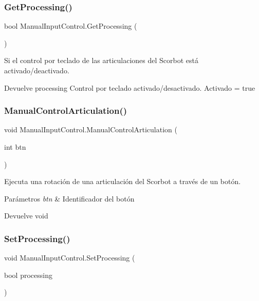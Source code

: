\subsubsection{\texorpdfstring{GetProcessing()}{GetProcessing()}}
{\footnotesize\ttfamily bool Manual\+Input\+Control.\+Get\+Processing (\begin{DoxyParamCaption}{ }\end{DoxyParamCaption})\hspace{0.3cm}{\ttfamily [inline]}}

Si el control por teclado de las articulaciones del Scorbot está activado/deactivado. \begin{DoxyReturn}{Devuelve}
processing Control por teclado activado/desactivado. Activado = true 
\end{DoxyReturn}
\mbox{\label{class_manual_input_control_a1e39de6319d6aad69e82f083d6d42058}} 
\subsubsection{\texorpdfstring{ManualControlArticulation()}{ManualControlArticulation()}}
{\footnotesize\ttfamily void Manual\+Input\+Control.\+Manual\+Control\+Articulation (\begin{DoxyParamCaption}\item[{int}]{btn }\end{DoxyParamCaption})\hspace{0.3cm}{\ttfamily [inline]}}

Ejecuta una rotación de una articulación del Scorbot a través de un botón. 
\begin{DoxyParams}{Parámetros}
{\em btn} & Identificador del botón \\
\hline
\end{DoxyParams}
\begin{DoxyReturn}{Devuelve}
void 
\end{DoxyReturn}
\mbox{\label{class_manual_input_control_a8505abe190f5ce3a1a1b76d2e94e695f}} 
\subsubsection{\texorpdfstring{SetProcessing()}{SetProcessing()}}
{\footnotesize\ttfamily void Manual\+Input\+Control.\+Set\+Processing (\begin{DoxyParamCaption}\item[{bool}]{processing }\end{DoxyParamCaption})\hspace{0.3cm}{\ttfamily [inline]}}

